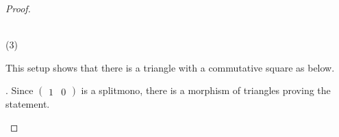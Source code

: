 \begin{proof}
\begin{center}
\begin{tikzcd}[row sep=small]
            \end{tikzcd} \\
            (3)
        \end{center}
        This setup shows that there is a triangle with a commutative square as below.
        \begin{center}
        \end{center}.
        Since $\begin{pmatrix}1 & 0\end{pmatrix}$ is a splitmono, there is a morphism of triangles proving the statement.
        \begin{center}
        \end{center}
    \end{proof}

